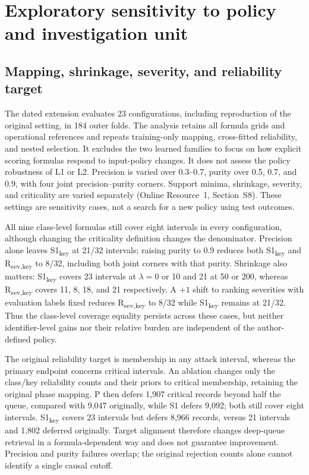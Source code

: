 \documentclass[pdflatex,sn-basic,Numbered]{sn-jnl}
\newcommand{\key}{\textsubscript{key}}
\newcommand{\Rsev}{R\textsubscript{sev,key}}
\begin{document}
\section{Exploratory sensitivity to policy and investigation unit}
\label{sec:sensitivity}

\subsection{Mapping, shrinkage, severity, and reliability target}
The dated extension evaluates 23 configurations, including reproduction of the original setting, in 184 outer folds. The analysis retains all formula grids and operational references and repeats training-only mapping, cross-fitted reliability, and nested selection. It excludes the two learned families to focus on how explicit scoring formulas respond to input-policy changes. It does not assess the policy robustness of L1 or L2. Precision is varied over 0.3--0.7, purity over 0.5, 0.7, and 0.9, with four joint precision--purity corners. Support minima, shrinkage, severity, and criticality are varied separately (Online Resource~1, Section~S8). These settings are sensitivity cases, not a search for a new policy using test outcomes.

All nine class-level formulas still cover eight intervals in every configuration, although changing the criticality definition changes the denominator. Precision alone leaves S1\key{} at 21/32 intervals; raising purity to 0.9 reduces both S1\key{} and \Rsev{} to 8/32, including both joint corners with that purity. Shrinkage also matters: S1\key{} covers 23 intervals at $\lambda=0$ or 10 and 21 at 50 or 200, whereas \Rsev{} covers 11, 8, 18, and 21 respectively. A $+1$ shift to ranking severities with evaluation labels fixed reduces \Rsev{} to 8/32 while S1\key{} remains at 21/32. Thus the class-level coverage equality persists across these cases, but neither identifier-level gains nor their relative burden are independent of the author-defined policy.

The original reliability target is membership in any attack interval, whereas the primary endpoint concerns critical intervals. An ablation changes only the class/key reliability counts and their priors to critical membership, retaining the original phase mapping. P then defers 1,907 critical records beyond half the queue, compared with 9,047 originally, while S1 defers 9,092; both still cover eight intervals. S1\key{} covers 23 intervals but defers 8,966 records, versus 21 intervals and 1,802 deferred originally. Target alignment therefore changes deep-queue retrieval in a formula-dependent way and does not guarantee improvement. Precision and purity failures overlap; the original rejection counts alone cannot identify a single causal cutoff.
\end{document}
